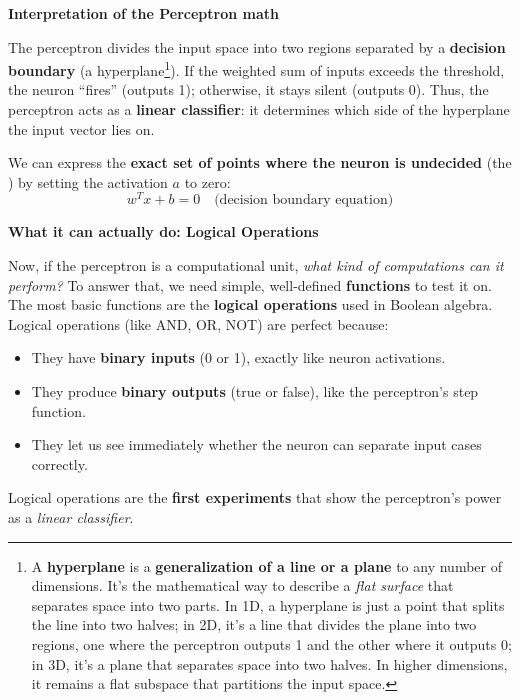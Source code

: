 \highspace
\begin{flushleft}
    \textcolor{Green3}{ \textbf{Interpretation of the Perceptron math}}
\end{flushleft}
The perceptron divides the input space into two regions separated by a \textbf{decision boundary} (a hyperplane\footnote{%
        A \textbf{hyperplane} is a \textbf{generalization of a line or a plane} to any number of dimensions. It's the mathematical way to describe a \emph{flat surface} that separates space into two parts. In 1D, a hyperplane is just a point that splits the line into two halves; in 2D, it's a line that divides the plane into two regions, one where the perceptron outputs 1 and the other where it outputs 0; in 3D, it's a plane that separates space into two halves. In higher dimensions, it remains a flat subspace that partitions the input space.
}). If the weighted sum of inputs exceeds the threshold, the neuron ``fires'' (outputs 1); otherwise, it stays silent (outputs 0). Thus, the perceptron acts as a \textbf{linear classifier}: it determines which side of the hyperplane the input vector lies on.

\highspace
We can express the \textbf{exact set of points where the neuron is undecided} (the ) by setting the activation $a$ to zero:
\begin{equation}
    w^T x + b = 0 \quad \text{(decision boundary equation)}
\end{equation}

\highspace
\begin{flushleft}
    \textcolor{Green3}{ \textbf{What it can actually do: Logical Operations}}
\end{flushleft}
Now, if the perceptron is a computational unit, \emph{what kind of computations can it perform?} To answer that, we need simple, well-defined \textbf{functions} to test it on. The most basic functions are the \textbf{logical operations} used in Boolean algebra. Logical operations (like AND, OR, NOT) are perfect because:
\begin{itemize}
    \item They have \textbf{binary inputs} (0 or 1), exactly like neuron activations.
    \item They produce \textbf{binary outputs} (true or false), like the perceptron's step function.
    \item They let us see immediately whether the neuron can separate input cases correctly.
\end{itemize}
Logical operations are the \textbf{first experiments} that show the perceptron's power as a \emph{linear classifier}.

